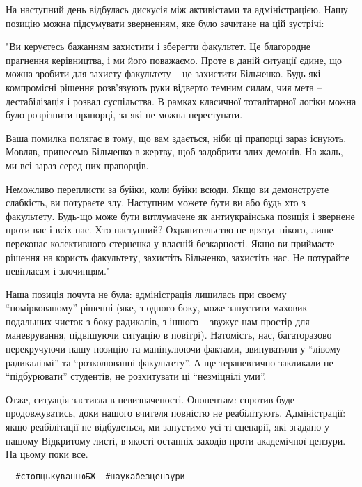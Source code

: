 На наступний день відбулась дискусія між активістами та адміністрацією. Нашу
позицію можна підсумувати зверненням, яке було зачитане на цій зустрічі: 

"Ви керуєтесь бажанням захистити і зберегти факультет. Це благородне прагнення
керівництва, і ми його поважаємо. Проте в даній ситуації єдине, що можна
зробити для захисту факультету – це захистити Більченко. Будь які компромісні
рішення розв'язують руки відверто темним силам, чия мета – дестабілізація і
розвал суспільства. В рамках класичної тоталітарної логіки можна було
розрізнити прапорці, за які не можна переступати. 

Ваша помилка полягає в тому,
що вам здається, ніби ці прапорці зараз існують. Мовляв, принесемо Більченко в
жертву, щоб задобрити злих демонів. На жаль, ми всі зараз серед цих прапорців.

Неможливо переплисти за буйки, коли буйки всюди. Якщо ви демонструєте
слабкість, ви потураєте злу. Наступним можете бути ви або будь хто з
факультету. Будь-що може бути витлумачене як антиукраїнська позиція і звернене
проти вас і всіх нас. Хто наступний? Охранительство не врятує нікого, лише
переконає колективного стерненка у власній безкарності. Якщо ви приймаєте
рішення на користь факультету, захистіть Більченко, захистіть нас. Не потурайте
невігласам і злочинцям."

Наша позиція почута не була: адміністрація лишилась при своєму
\enquote{поміркованому} рішенні (яке, з одного боку, може запустити маховик
подальших чисток з боку радикалів, з іншого – звужує нам простір для
маневрування, підвішуючи ситуацію в повітрі). Натомість, нас, багаторазово
перекручуючи нашу позицію та маніпулюючи фактами, звинуватили у \enquote{лівому
радикалізмі} та \enquote{розколюванні факультету}. А ще терапевтично закликали
не \enquote{підбурювати} студентів, не розхитувати ці \enquote{незміцнілі уми}. 

Отже, ситуація застигла в невизначеності. Опонентам: спротив буде
продовжуватись, доки нашого вчителя повністю не реабілітують. Адміністрації:
якщо реабілітації не відбудеться, ми запустимо усі ті сценарії, які згадано у
нашому Відкритому листі, в якості останніх заходів проти академічної цензури.
На цьому поки все.

\begin{verbatim}
  #стопцькуваннюБЖ  #наукабезцензури
\end{verbatim}

